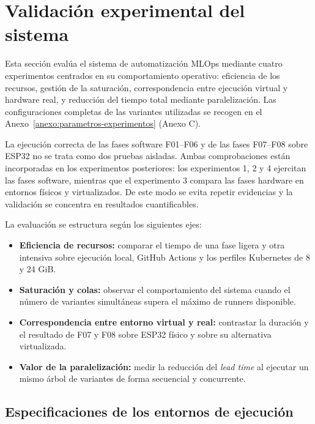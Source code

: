 \section{Validación experimental del sistema}
\label{sec:validacion-experimental}

Esta sección evalúa el sistema de automatización MLOps mediante cuatro experimentos centrados en su comportamiento operativo: eficiencia de los recursos, gestión de la saturación, correspondencia entre ejecución virtual y hardware real, y reducción del tiempo total mediante paralelización. Las configuraciones completas de las variantes utilizadas se recogen en el Anexo~\ref{anexo:parametros-experimentos} (Anexo C).

La ejecución correcta de las fases software F01--F06 y de las fases F07--F08 sobre ESP32 no se trata como dos pruebas aisladas. Ambas comprobaciones están incorporadas en los experimentos posteriores: los experimentos 1, 2 y 4 ejercitan las fases software, mientras que el experimento 3 compara las fases hardware en entornos físicos y virtualizados. De este modo se evita repetir evidencias y la validación se concentra en resultados cuantificables.

La evaluación se estructura según los siguientes ejes:

\begin{itemize}
    \item \textbf{Eficiencia de recursos:} comparar el tiempo de una fase ligera y otra intensiva sobre ejecución local, GitHub Actions y los perfiles Kubernetes de 8 y 24 GiB.
    \item \textbf{Saturación y colas:} observar el comportamiento del sistema cuando el número de variantes simultáneas supera el máximo de runners disponible.
    \item \textbf{Correspondencia entre entorno virtual y real:} contrastar la duración y el resultado de F07 y F08 sobre ESP32 físico y sobre su alternativa virtualizada.
    \item \textbf{Valor de la paralelización:} medir la reducción del \textit{lead time} al ejecutar un mismo árbol de variantes de forma secuencial y concurrente.
\end{itemize}

\subsection{Especificaciones de los entornos de ejecución}
\label{subsec:entornos-ejecucion}

